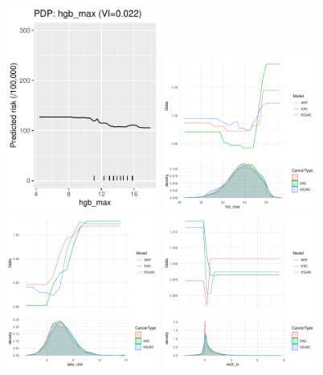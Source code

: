 \documentclass[12pt]{article}
\begin{document}
\clearpage
\begin{figure}[h]
\centering
\includegraphics[width=0.45\textwidth]{figures/pdp/hgb_max.pdf}
\includegraphics[width=0.45\textwidth]{figures/pdp/hct_max.pdf}
\includegraphics[width=0.45\textwidth]{figures/pdp/wbc_min.pdf}
\includegraphics[width=0.45\textwidth]{figures/pdp/mch_tv.pdf}
\end{figure}
\end{document}
